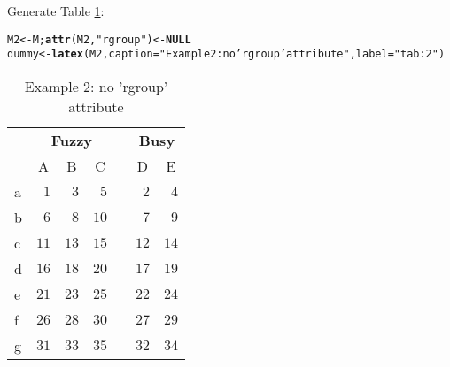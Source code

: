 \documentclass{article}\usepackage[]{graphicx}\usepackage[]{color}
\makeatletter
\newcommand{\hlstr}[1]{\textcolor[rgb]{0.192,0.494,0.8}{#1}}%
\newcommand{\hlstd}[1]{\textcolor[rgb]{0.345,0.345,0.345}{#1}}%
\newcommand{\hlkwa}[1]{\textcolor[rgb]{0.161,0.373,0.58}{\textbf{#1}}}%
\newcommand{\hlkwb}[1]{\textcolor[rgb]{0.69,0.353,0.396}{#1}}%
\newcommand{\hlkwc}[1]{\textcolor[rgb]{0.333,0.667,0.333}{#1}}%
\newcommand{\hlkwd}[1]{\textcolor[rgb]{0.737,0.353,0.396}{\textbf{#1}}}%
\newenvironment{kframe}{%
 \def\at@end@of@kframe{}%
 \ifinner\ifhmode%
  \def\at@end@of@kframe{\end{minipage}}%
  \begin{minipage}{\columnwidth}%
 \fi\fi%
 \def\FrameCommand##1{\hskip\@totalleftmargin \hskip-\fboxsep
 \colorbox{shadecolor}{##1}\hskip-\fboxsep
     \hskip-\linewidth \hskip-\@totalleftmargin \hskip\columnwidth}%
 \MakeFramed {\advance\hsize-\width
   \@totalleftmargin\z@ \linewidth\hsize
   \@setminipage}}%
 {\par\unskip\endMakeFramed%
 \at@end@of@kframe}
\makeatother
\begin{document}
Generate Table  \ref{tab:2}:
\begin{kframe}
\begin{alltt}
\hlstd{M2} \hlkwb{<-} \hlstd{M;} \hlkwd{attr}\hlstd{(M2,} \hlstr{"rgroup"}\hlstd{)} \hlkwb{<-} \hlkwa{NULL}
\hlstd{dummy} \hlkwb{<-} \hlkwd{latex}\hlstd{(M2,} \hlkwc{caption}\hlstd{=}\hlstr{"Example 2: no 'rgroup' attribute"}\hlstd{,} \hlkwc{label}\hlstd{=}\hlstr{"tab:2"}\hlstd{)}
\end{alltt}
\end{kframe}%
\begin{table}[!tbp]
\caption{Example 2: no 'rgroup' attribute\label{tab:2}} 
\begin{center}
\begin{tabular}{lrrrcrr}
\hline\hline
\multicolumn{1}{l}{\bfseries }&\multicolumn{3}{c}{\bfseries Fuzzy}&\multicolumn{1}{c}{\bfseries }&\multicolumn{2}{c}{\bfseries Busy}\tabularnewline
\cline{2-4} \cline{6-7}
\multicolumn{1}{l}{}&\multicolumn{1}{c}{A}&\multicolumn{1}{c}{B}&\multicolumn{1}{c}{C}&\multicolumn{1}{c}{}&\multicolumn{1}{c}{D}&\multicolumn{1}{c}{E}\tabularnewline
\hline
a&$ 1$&$ 3$&$ 5$&&$ 2$&$ 4$\tabularnewline
b&$ 6$&$ 8$&$10$&&$ 7$&$ 9$\tabularnewline
c&$11$&$13$&$15$&&$12$&$14$\tabularnewline
d&$16$&$18$&$20$&&$17$&$19$\tabularnewline
e&$21$&$23$&$25$&&$22$&$24$\tabularnewline
f&$26$&$28$&$30$&&$27$&$29$\tabularnewline
g&$31$&$33$&$35$&&$32$&$34$\tabularnewline
\hline
\end{tabular}\end{center}

\end{table}
\end{document}
